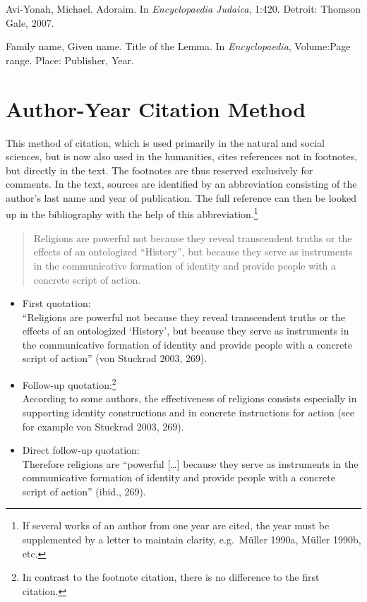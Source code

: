 \documentclass[
  english,
]{scrreprt}
\begin{document}
Avi-Yonah, Michael. Adoraim. In \emph{Encyclopaedia Judaica}, 1:420. Detroit: Thomson Gale, 2007.

Family name, Given name. Title of the Lemma. In \emph{Encyclopaedia}, Volume:Page range. Place: Publisher, Year.

\section{Author-Year Citation Method}\label{author-year-citation-method}

This method of citation, which is used primarily in the natural and social sciences, but is now also used in the humanities, cites references not in footnotes, but directly in the text. The footnotes are thus reserved exclusively for comments. In the text, sources are identified by an abbreviation consisting of the author’s last name and year of publication. The full reference can then be looked up in the bibliography with the help of this abbreviation.\footnote{If several works of an author from one year are cited, the year must be supplemented by a letter to maintain clarity, e.g.~Müller 1990a, Müller 1990b, etc.}

\begin{quote}
Religions are powerful not because they reveal transcendent truths or the effects of an ontologized “History”, but because they serve as instruments in the communicative formation of identity and provide people with a concrete script of action.
\end{quote}

\begin{itemize}
\item
  First quotation:\\
  “Religions are powerful not because they reveal transcendent truths or the effects of an ontologized ‘History’, but because they serve as instruments in the communicative formation of identity and provide people with a concrete script of action” (von Stuckrad 2003, 269).
\item
  Follow-up quotation:\footnote{In contrast to the footnote citation, there is no difference to the first citation.}\\
  According to some authors, the effectiveness of religions consists especially in supporting identity constructions and in concrete instructions for action (see for example von Stuckrad 2003, 269).
\item
  Direct follow-up quotation:\\
  Therefore religions are “powerful {[}…{]} because they serve as instruments in the communicative formation of identity and provide people with a concrete script of action” (ibid., 269).
\end{itemize}
\end{document}

